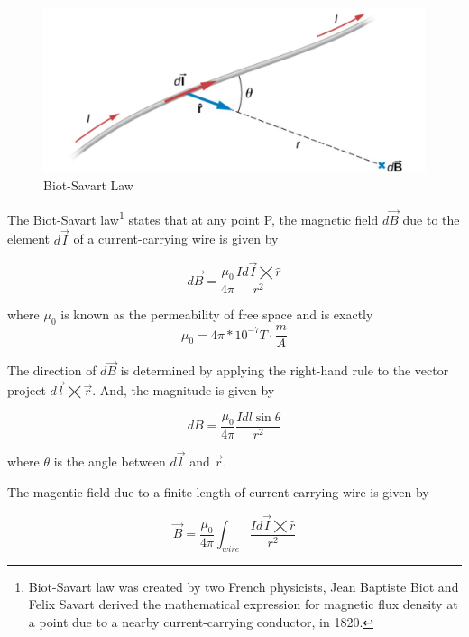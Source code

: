 \documentclass[14pt]{memoir}
\begin{document}
\begin{figure}[H]
\begin{center}
\includegraphics[scale=0.50]{fig/fig_12_02.jpg}
\caption{Biot-Savart Law}
\label{fig:12_02}
\end{center}
\end{figure}

The Biot-Savart law\footnote{Biot-Savart law was created by two French physicists, Jean Baptiste Biot and Felix Savart derived the mathematical expression for magnetic flux density at a point due to a nearby current-carrying conductor, in 1820.} states that at any point P, the magnetic field $d\vec{B}$ due to the element $d\vec{I}$ of a current-carrying wire is given by

\begin{equation}
d\vec{B} = \frac{\mu_0}{4\pi} \frac{I d\vec{I} \bigtimes \hat{r}}{r^2}
\end{equation}

where $\mu_0$ is known as the permeability of free space and is exactly 
\begin{equation}
\mu_0 = 4\pi * 10^{-7} T \cdot \frac{m}{A}
\end{equation}

The direction of $d\vec{B}$ is determined by applying the right-hand rule to the vector project $d\vec{l} \bigtimes \vec{r}$. And, the magnitude is given by 

\begin{equation}
dB = \frac{\mu_0}{4\pi} \frac{I dl \sin{\theta}}{r^2}
\end{equation}

where $\theta$ is the angle between $d\vec{l}$ and $\vec{r}$.

The magentic field due to a finite length of current-carrying wire is given by

\begin{equation}
\vec{B} = \frac{\mu_0}{4\pi} \int_{wire} \frac{I d\vec{I} \bigtimes \hat{r}}{r^2}
\end{equation}
\end{document}
